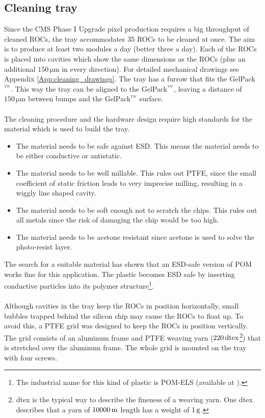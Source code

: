 \subsection{Cleaning tray}
Since the \ac{CMS} Phase I Upgrade pixel production requires a big throughput of cleaned \acs{ROC}s, the tray accommodates 35 \acs{ROC}s to be cleaned at once. The aim is to produce at least two modules a day (better three a day). Each of the \acs{ROC}s is placed into cavities which show the same dimensions as the \acs{ROC}s (plus an additional $150\, \si{\micro \meter}$ in every direction). For detailed mechanical drawings see Appendix \ref{App:cleaning_drawings}. The tray has a furrow that fits the GelPack$\rm{\symbTM}$. This way the tray can be aligned to the GelPack$\rm{\symbTM}$, leaving a distance of $150\,\si{\micro \meter}$ between bumps and the GelPack$\rm{\symbTM}$ surface.\\
\\The cleaning procedure and the hardware design require high standards for the material which is used to build the tray.
\begin{itemize}
\item The material needs to be safe against \ac{ESD}. This means the material needs to be either conductive or antistatic.
\item The material needs to be well millable. This rules out \ac{PTFE}, since the small coefficient of static friction leads to very imprecise milling, resulting in a wiggly line shaped cavity.
\item The material needs to be soft enough not to scratch the chips. This rules out all metals since the risk of damaging the chip would be too high.
\item The material needs to be acetone resistant since acetone is used to solve the photo-resist layer.
\end{itemize}
The search for a suitable material has shown that an \ac{ESD}-safe version of \ac{POM} works fine for this application. The plastic becomes \ac{ESD} safe by inserting conductive particles into its polymer structure\footnote{The industrial name for this kind of plastic is \acs{POM}-ELS (available at \cite{KHP14}).}.
\\
\\Although cavities in the tray keep the \acs{ROC}s in position horizontally, small bubbles trapped behind the silicon chip may cause the \acs{ROC}s to float up. To avoid this, a \ac{PTFE} grid was designed to keep the \acs{ROC}s in position vertically. The grid consists of an aluminum frame and \ac{PTFE} weaving yarn ($220\,\rm{dtex}$\footnote{dtex is the typical way to describe the fineness of a weaving yarn. One dtex describes that a yarn of $10000\, \rm{m}$ length has a weight of $1\,\rm{g}$.}) that is stretched over the aluminum frame. The whole grid is mounted on the tray with four screws.

